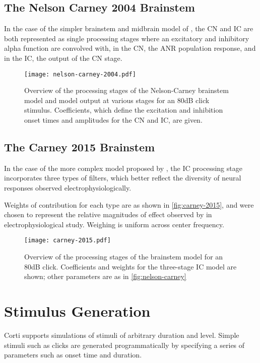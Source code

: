 \subsection{The Nelson Carney 2004 Brainstem} %
In the case of the simpler brainstem and midbrain model of \cite{Nelson2004Phenomenological}, the CN and IC are both represented as single processing stages where an excitatory and inhibitory alpha function are convolved with, in the CN, the ANR population response, and in the IC, the output of the CN stage. 
\label{sub:the_nelson_carney_2004_brainstem}
\begin{figure}[htbp]
	\centering
	\texttt{[image: nelson-carney-2004.pdf]}
	\caption[Overview of the Nelson-Carney Midbrain and Brainstem]{Overview of the processing stages of the Nelson-Carney brainstem model and model output at various stages for an 80dB click stimulus. Coefficients, which define the excitation and inhibition onset times and amplitudes for the CN and IC, are given. }
	\label{fig:nelson-carney}
\end{figure}
\subsection{The Carney 2015 Brainstem} %
\label{sub:the_carney_2015_brainstem}
In the case of the more complex model proposed by \cite{Carney2015Speech}, the IC processing stage incorporates three types of filters, which better reflect the diversity of neural responses observed electrophysiologically. 

Weights of contribution for each type are as shown in \autoref{fig:carney-2015}, and were chosen to represent the relative magnitudes of effect observed by \cite{Carney2015Speech} in electrophysiological study.  Weighing is uniform across center frequency.

\begin{figure}[htbp]
	\centering
	\texttt{[image: carney-2015.pdf]}
	\caption[Overview of the Carney Midbrain and Brainstem]{Overview of the processing stages of the \cite{Carney2015Speech} brainstem model for an 80dB click.  Coefficients and weights for the three-stage IC model are shown; other parameters are as in \autoref{fig:nelson-carney}}
	\label{fig:carney-2015}
\end{figure}


\section{Stimulus Generation} %
\label{sec:stimulus_generation}
Corti supports simulations of stimuli of arbitrary duration and level.  Simple stimuli such as clicks are generated programmatically by specifying a series of parameters such as onset time and duration.  

